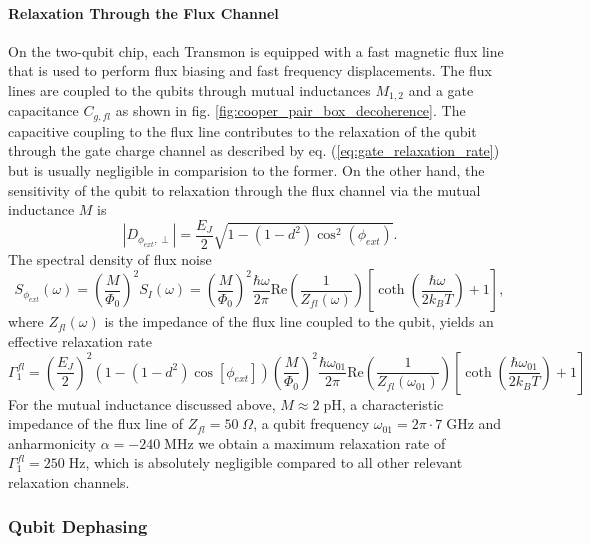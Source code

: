 \paragraph{Relaxation Through the Flux Channel}

On the two-qubit chip, each Transmon is equipped with a fast magnetic flux line that is used to perform flux biasing and fast frequency displacements. The flux lines are coupled to the qubits through mutual inductances $M_{1,2}$ and a gate capacitance $C_{g,fl}$ as shown in fig. \ref{fig:cooper_pair_box_decoherence}. The capacitive coupling to the flux line contributes to the relaxation of the qubit through the gate charge channel as described by eq. (\ref{eq:gate_relaxation_rate}) but is usually negligible in comparision to the former. On the other hand, the sensitivity of the qubit to relaxation through the flux channel via the mutual inductance $M$ is
%
\begin{equation}
\left|D_{\phi_{ext},\perp}\right|  = \frac{E_J}{2}\sqrt{1-(1-d^2)\cos^2{\left(\phi_{ext}\right)}}.
\end{equation}
%
The spectral density of flux noise
%
\begin{equation}
S_{\phi_{ext}}(\omega) = \left(\frac{M}{\Phi_0}\right)^2 S_I(\omega) = \left(\frac{M}{\Phi_0}\right)^2\frac{\hbar\omega}{2\pi}\mathrm{Re}\left(\frac{1}{Z_{fl}(\omega)}\right)\left[\coth{\left(\frac{\hbar\omega}{2k_B T}\right)}+1\right],
\end{equation}
%
where $Z_{fl}(\omega)$ is the impedance of the flux line coupled to the qubit, yields an effective relaxation rate
%
\begin{equation}
\Gamma_1^{fl}= \left(\frac{E_J}{2}\right)^2\left(1-(1-d^2)\cos{\left[\phi_{ext}\right]}\right)\left(\frac{M}{\Phi_0}\right)^2\frac{\hbar \omega_{01}}{2\pi}\mathrm{Re}\left(\frac{1}{Z_{fl}(\omega_{01})}\right)\left[\coth{\left(\frac{\hbar\omega_{01}}{2 k_B T}\right)}+1\right]
\end{equation}
%
For the mutual inductance discussed above, $M\approx 2\;\mathrm{pH}$, a characteristic impedance of the flux line of $Z_{fl}=50\;\Omega$, a qubit frequency $\omega_{01}=2\pi \cdot 7 \;\mathrm{GHz}$ and anharmonicity $\alpha=-240\;\mathrm{MHz}$ we obtain a maximum relaxation rate of $\Gamma_1^{fl}=250\;\mathrm{Hz}$, which is absolutely negligible compared to all other relevant relaxation channels.

\subsubsection{Qubit Dephasing}

